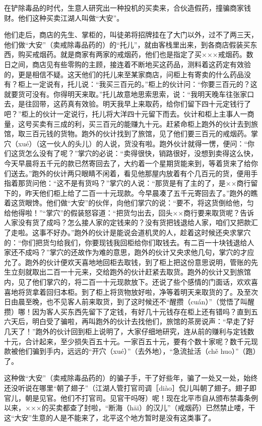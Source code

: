 \documentclass[12pt,UTF8]{ctexbook}
\begin{document}
在铲除毒品的时代，生意人研究出一种投机的买卖来，合伙造假药，撞骗商家钱财。他们这种买卖江湖人叫做“大安”。



他们走后，商店的先生、掌柜的，叫徒弟将招牌挂在了大门以外，过不了两三天，他们做“大安”（卖戒除毒品药的）的“托儿”，就由客栈里出来，到各商店假装买东西，购买戒烟药。就是商家有两家的戒烟药，他们也是指定了买×××戒烟药。数日之间，商店见有些零购的主顾，接连着不断地买这药品，测料着这药定有效验的，更是相信不疑。这天他们的托儿来至某家商店，问柜上有寄卖的什么药品没有？柜上一定说有，托儿说：“我买三百元的。”柜上的伙计问：“你要三百元的？这就要货可没有。你得明天来取。”托儿故意地思索思索，说：“我明天晚车往张家口去，是往回带，这药真有效验。明天我早上来取药，给你们留下四十元定钱行了吧？”柜上的伙计一定说行，托儿将大洋四十元留下而去。伙计和柜上主事人一商量，这号买卖有三成的利，买三百元的能赚九十元。赶紧命柜上跑外的伙计去到旅馆，取三百元钱的货物。跑外的伙计找到了旅馆，见了他们要三百元的戒烟药。掌穴（xué）（这一伙人的头儿）的人说，货没有啦。跑外伙计就得一愣，便问：“你们这货怎么没有了呢？”掌穴的必说：“卖得很快，销路很好，没想到卖得这么快，今天早晨将五千元的款已然寄回去了，大约着一个星期货能来到，等着货来了给你们送去。”跑外的伙计两只眼睛不闲着，看见他那屋内放着有个几百元的货，便用手指着那货问他：“这不是有货吗？”掌穴的人说：“那货是有了主的了，是××商行留下的，昨天他们柜上给了二百一十元现款。今早晨凑了五千元寄回去了。”跑外的瞧着这货眼馋。他们做“大安”的伙伴，向他们掌穴的说：“要不，将这货倒给他，匀给他得啦！”“掌穴”的假装怒容道：“把货匀出去，回头××商行要来取货呢？告诉人家没有货了成吗？怎么接人家的定钱来的？没有货把钱退给人家，咱们又把款汇了走啦。这事不好办。”跑外的伙计是能说会道机灵的人，趁着这时候还央求掌穴的：“你们把货匀给我们，你要现钱我回柜给你们取钱去。有二百一十块钱退给人家还不成吗？”掌穴的还故作为难的意思，跑外的伙计又央求他几句，掌穴的才应允了。跑外的伙计便欢天喜地地回柜去取钱，到了柜上把这份意思说明，管账的先生立刻就取出二百一十元来，交给跑外的伙计赶紧去取货。跑外的伙计又到旅馆内，见了他们掌穴的，将二百一十元现款放下。还说了些个感情的门面话，欢欢喜喜地将货拿着回归本柜。到了柜上将货物放好啦，净等着明天来取货的了。及至次日由晨至晚，也不见客人前来取货，到了这时候还不“醒攒（cuán）”（觉悟了叫醒攒）哪！因为客人买东西先留下了定钱，有好几十元钱存在柜上还有错吗？直到五六天后，明白受了骗啦，再叫跑外的伙计去找他们，旅馆的茶房说声：“早走了好几天了！”跑外的伙计回到柜上说明了，大家仔细地研究，连从前的赚利与定钱数十元，合计起来，至少损失百五十元。一家百五十元，要有个数十家呢？数千元现款被他们骗到手内，远远的“开穴（xué）”（去外地），“急流扯活（chě huo）”（跑）了。

这种做“大安”（卖戒除毒品药的）的骗子手，干了好些年，骗了一处又一处，始终还没听说在哪里“朝了翅子”（江湖人管打官司调［diào］侃儿叫朝了翅子。翅子即官儿，朝是见官。他们不打官司。见官干吗呀）呢！现在北平市自从颁布禁毒条例以来，×××的买卖都查了封啦，“断海（hāi）的汉儿”（戒烟药）已然禁止喽，干这“大安”生意的人是不能来了，北平这个地方暂时是没有这类事了。
\end{document}
